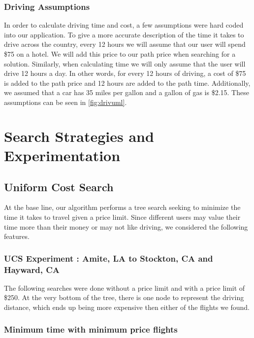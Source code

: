 \documentclass[11pt]{article}
\begin{document}
\subsubsection{Driving Assumptions}

In order to calculate driving time and cost, a few assumptions were hard coded into our application. To give a more accurate description of the time it takes to drive across the country, every 12 hours we will assume that our user will spend \$75 on a hotel. We will add this price to our path price when searching for a solution. Similarly, when calculating time we will only assume that the user will drive 12 hours a day. In other words, for every 12 hours of driving, a cost of \$75 is added to the path price and 12 hours are added to the path time. Additionally, we assumed that a car has 35 miles per gallon and a gallon of gas is \$2.15.
These assumptions can be seen in \ref{fig:drivuml}.


\section{Search Strategies and Experimentation}\label{sec:search}

\subsection{Uniform Cost Search}

At the base line, our algorithm performs a tree search seeking to minimize the time it takes to travel given a price limit. 
Since different users may value their time more than their money or may not like driving, we considered the following features.

\subsubsection{UCS Experiment : Amite, LA to Stockton, CA and Hayward, CA}

The following searches were done without a price limit and with a price limit of \$250. At the very bottom of the tree, there is one node to represent the driving distance, which ends up being more expensive then either of the flights we found. 

\subsubsection{Minimum time with minimum price flights}\label{sec:sol}
\end{document}
